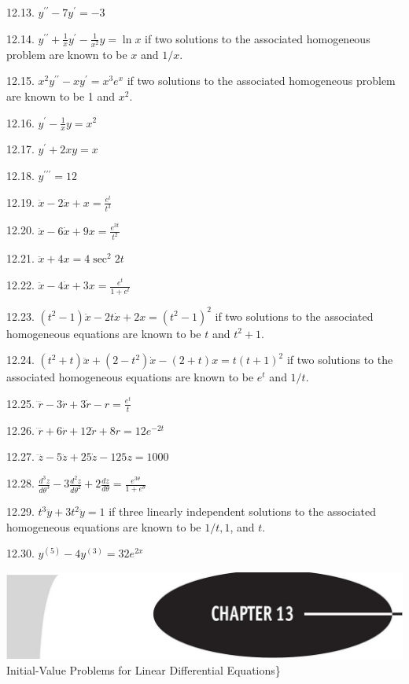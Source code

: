\documentclass[10pt]{article}
\begin{document}
12.13. $y^{\prime \prime}-7 y^{\prime}=-3$

12.14. $y^{\prime \prime}+\frac{1}{x} y^{\prime}-\frac{1}{x^{2}} y=\ln x$ if two solutions to the associated homogeneous problem are known to be $x$ and $1 / x$.

12.15. $x^{2} y^{\prime \prime}-x y^{\prime}=x^{3} e^{x}$ if two solutions to the associated homogeneous problem are known to be 1 and $x^{2}$.

12.16. $y^{\prime}-\frac{1}{x} y=x^{2}$

12.17. $y^{\prime}+2 x y=x$

12.18. $y^{\prime \prime \prime}=12$

12.19. $\ddot{x}-2 \dot{x}+x=\frac{e^{t}}{t^{3}}$

12.20. $\ddot{x}-6 \dot{x}+9 x=\frac{e^{3 t}}{t^{2}}$

12.21. $\ddot{x}+4 x=4 \sec ^{2} 2 t$

12.22. $\ddot{x}-4 \dot{x}+3 x=\frac{e^{t}}{1+e^{t}}$

12.23. $\left(t^{2}-1\right) \ddot{x}-2 t \dot{x}+2 x=\left(t^{2}-1\right)^{2}$ if two solutions to the associated homogeneous equations are known to be $t$ and $t^{2}+1$.

12.24. $\left(t^{2}+t\right) \ddot{x}+\left(2-t^{2}\right) \dot{x}-(2+t) x=t(t+1)^{2}$ if two solutions to the associated homogeneous equations are known to be $e^{t}$ and $1 / t$.

12.25. $\dddot{r}-3 \ddot{r}+3 \dot{r}-r=\frac{e^{t}}{t}$

12.26. $\dddot{r}+6 \ddot{r}+12 \dot{r}+8 r=12 e^{-2 t}$

12.27. $\dddot{z}-5 \ddot{z}+25 \dot{z}-125 z=1000$

12.28. $\frac{d^{3} z}{d \theta^{3}}-3 \frac{d^{2} z}{d \theta^{2}}+2 \frac{d z}{d \theta}=\frac{e^{3 \theta}}{1+e^{\theta}}$

12.29. $t^{3} \dddot{y}+3 t^{2} \ddot{y}=1$ if three linearly independent solutions to the associated homogeneous equations are known to be $1 / t, 1$, and $t$.

12.30. $y^{(5)}-4 y^{(3)}=32 e^{2 x}$

\includegraphics[max width=\textwidth, center]{2024_04_03_5bb5b4275a64cb9887d1g-128}\\
Initial-Value Problems for Linear Differential Equations\}
\end{document}

